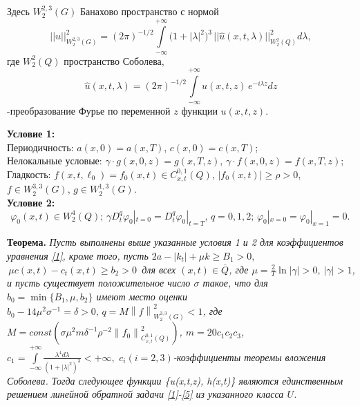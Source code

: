 Здесь $W_{2}^{2,3} (G)$ Банахово пространство с нормой
$$||u||^{2}_{W_{2}^{2,3}(G)}=(2\pi)^{-1/2}\int\limits_{-\infty}^{+\infty}\big(1+|\lambda|^{2}\big)^{3}\, ||\hat{u}(x,t,\lambda)||^{2}_{W_{2}^{2}(Q)} d \lambda,    $$
где $W_{2}^{2} (Q)$ пространство Соболева,
$$\hat{u}(x,t,\lambda )=(2\pi )^{-1/2} \int\limits_{-\infty }^{+\infty }u(x,t,z)\,  e^{-i\lambda z} dz$$
-преобразование Фурье по переменной $z$ функции $u(x,t,z)$.

{\bf Условие 1:} \\
Периодичность: $a(x,0)=a(x,T)$, $c(x,0)=c(x,T)$;\\
Нелокальные условые:  $\gamma \cdot g(x,0,z)=g(x,T,z)$, $\gamma \cdot f(x,0,z)=f(x,T,z)$;\\
Гладкость: $f(x,t,\ell_{0})=f_{0}(x,t)\in C_{x,t}^{0,1}(Q)$, $|f_{0}(x,t)|\geq \rho >0$, $f\in W_{2}^{3,3}(G)$, $g\in W_{2}^{1,3}(G) $.\\

{\bf Условие 2:} \\
$$\varphi _{0}(x,t)\in W_{2}^{4}(Q);\, \gamma D_{t}^{q}\varphi_{0}|_{t=0}=D_{t}^{q}\varphi _{0}|_{t=T},\, q=0,1,2;\,\varphi_{0}|_{x=0}=\varphi _{0}|_{x=1}=0.\,$$

{\bf Теорема.} {\it Пусть выполнены выше указанные условия 1 и 2 для коэффициентов уравнения \eqref{1}, кроме того, пусть
$2a-\left|k_{t}\right|+\mu k\geq B_{1}>0,$ $\,\mu c(x,t)-c_{t}(x,t) \ge b_{2}>0$\, для всех  $(x,t)\in \overline{Q}$, где $\mu=\frac{2}{T} \ln \left|\gamma \right|>0,\: \left|\gamma \right|>1$, и пусть существует положительное число  $\sigma$ такое, что для $b_{0}=\min \{B_{1},\mu,b_{2}\}$ имеют место оценки  $b_{0}-14\mu^{2}\sigma^{-1}=\delta>0, \, q=M \left\|f\right\|^{2}_{W_{2}^{3,3}(G)}<1$, где $M=const\left(\sigma\mu^{2}m\delta^{-1}\rho^{-2}\left\|f_{0}\right\|^{2}_{C_{x,t}^{0,1}(Q)}\right)$,  $m=20c_{1}c_{2}c_{3}$, $c_{1}=\int\limits_{-\infty}^{+\infty}\frac{\lambda^{4}d\lambda}{\left(1+|\lambda|^{2}\right)^{3}}<+\infty,\, \, c_{i}(i=2,3)$-коэффициенты теоремы вложения Соболева. Тогда следующее функции \{u(x,t,z),\; h(x,t)\} являются единственным решением линейной обратной задачи \eqref{1}-\eqref{5} из указанного класса $U$.}

